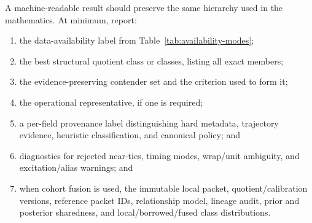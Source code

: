\documentclass[11pt]{article}
\begin{document}
    A machine-readable result should preserve the same hierarchy used in the mathematics.
    At minimum, report:
    \begin{enumerate}[nosep]
    \item the data-availability label from Table~\ref{tab:availability-modes};
    \item the best structural quotient class or classes, listing all exact members;
    \item the evidence-preserving contender set and the criterion used to form it;
    \item the operational representative, if one is required;
    \item a per-field provenance label distinguishing hard metadata, trajectory evidence,
    heuristic classification, and canonical policy; and
    \item diagnostics for rejected near-ties, timing modes, wrap/unit ambiguity, and
    excitation/alias warnings; and
    \item when cohort fusion is used, the immutable local packet, quotient/calibration
    versions, reference packet IDs, relationship model, lineage audit, prior and
    posterior sharedness, and local/borrowed/fused class distributions.
    \end{enumerate}
\end{document}
